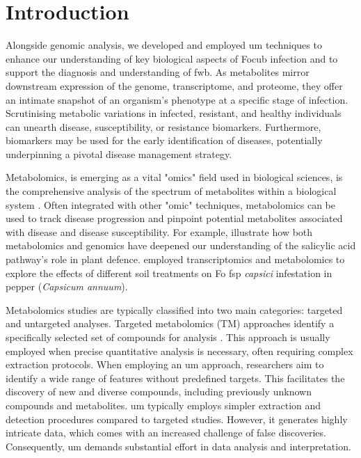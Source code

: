 
\section{Introduction}

Alongside genomic analysis, we developed and employed \acf{um} techniques to enhance our understanding of key biological aspects of \ac{Focub} infection and to support the diagnosis and understanding of \ac{fwb}. As metabolites mirror downstream expression of the genome, transcriptome, and proteome, they offer an intimate snapshot of an organism's phenotype at a specific stage of infection. Scrutinising metabolic variations in infected, resistant, and healthy individuals can unearth disease, susceptibility, or resistance biomarkers. Furthermore, biomarkers may be used for the early identification of diseases, potentially underpinning a pivotal disease management strategy. 

Metabolomics, is emerging as a vital "omics" field used in biological sciences, is the comprehensive analysis of the spectrum of metabolites within a biological system \parencite{Klassen2017}. Often integrated with other "omic" techniques, metabolomics can be used to track disease progression and pinpoint potential  metabolites associated with disease and disease susceptibility. For example, \textcite{Crandall2020} illustrate how both metabolomics and genomics have deepened our understanding of the salicylic acid pathway's role in plant defence. \textcite{Zhu2021} employed transcriptomics and metabolomics to explore the effects of different soil treatments on \ac{Fo} \ac{fsp} \textit{capsici} infestation in pepper (\textit{Capsicum annuum}). 

Metabolomics studies are typically classified into two main categories: targeted and untargeted analyses. Targeted metabolomics (TM) approaches identify a specifically selected set of compounds for analysis \parencite{Allwood2021}. This approach is usually employed when precise quantitative analysis is necessary, often requiring complex extraction protocols. When employing an \ac{um} approach, researchers aim to identify a wide range of features without predefined targets. This facilitates the discovery of new and diverse compounds, including previously unknown compounds and metabolites. \ac{um} typically employs simpler extraction and detection procedures compared to targeted studies. However, it generates highly intricate data, which comes with an increased challenge of false discoveries. Consequently, \ac{um} demands substantial effort in data analysis and interpretation.


